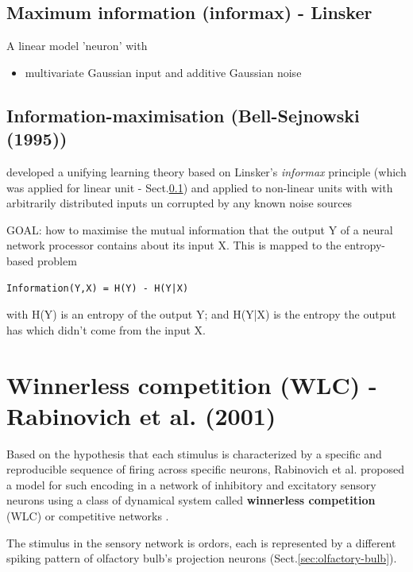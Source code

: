 \subsection{Maximum information (informax) - Linsker}
\label{sec:informax}
\label{sec:Linsker-informax}

A linear model 'neuron' with
\begin{itemize}
  \item multivariate Gaussian input and additive Gaussian noise
\end{itemize}

\subsection{Information-maximisation (Bell-Sejnowski (1995))}
\label{sec:Information-maximisation}
\label{sec:Bell-Sejnowski-1995-information-maximisation}


\citep{bell-sejnowski-1995} developed a unifying learning theory based on
Linsker's {\it informax} principle (which was applied for linear unit -
Sect.\ref{sec:informax}) and applied to non-linear units with with arbitrarily
distributed inputs un corrupted by any known noise sources


GOAL: how to maximise the mutual information that the output Y of a neural
network processor contains about its input X. This is mapped to the
entropy-based problem
\begin{verbatim}
Information(Y,X) = H(Y) - H(Y|X)
\end{verbatim}
with H(Y) is an entropy of the output Y; and H(Y|X) is the entropy the output
has which didn't come from the input X. 

\section{Winnerless competition (WLC) - Rabinovich et al. (2001)}

Based on the hypothesis that each stimulus is characterized by a specific and
reproducible sequence of firing across specific neurons, Rabinovich et al.
proposed a model for such encoding in a network of inhibitory and
excitatory sensory neurons using a class of dynamical system called {\bf
winnerless competition} (WLC) or competitive networks \citep{rabinovich2001}. 


The stimulus in the sensory network is ordors, each is represented by a 
different spiking pattern of olfactory bulb's projection neurons
(Sect.\ref{sec:olfactory-bulb}).

